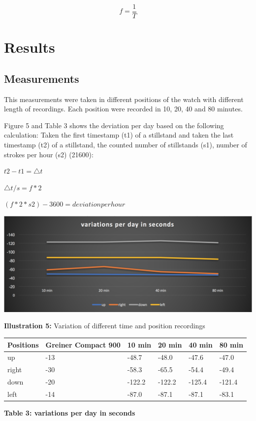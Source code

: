 \documentclass[12pt, a4paper]{report}
\begin{document}
 \begin{displaymath}
  f = \frac{1}{T}
 \end{displaymath}

\chapter{Results}

\section{Measurements}
This measurements were taken in different positions of the watch with different length
of recordings. Each position were recorded in 10, 20, 40 and 80 minutes.

Figure 5 and Table 3 shows the deviation per day based on the following calculation:
Taken the first timestamp (t1) of a stillstand and taken the last timestamp (t2) of a stillstand, the counted
number of stillstands (s1), number of strokes per hour (s2) (21600):
\bigskip

\(t2-t1 = \triangle t\)

\(\triangle t / s = f*2\)

\((f*2*s2)-3600=deviation per hour\)

\begin{center}
    \includegraphics[scale=0.3]{Images/variations_per_day.png}
    
    {\bf Illustration 5:} Variation of different time and position recordings
    \end{center}
\begin{table}[H]
    \begin{tabular}{|l|l|l|l|l|l|}
    \hline
    Positions & Greiner Compact 900 & 10 min & 20 min & 40 min & 80 min \\ \hline
    up        & -13                 & -48.7     & -48.0     & -47.6      & -47.0      \\ \hline
    right     & -30                 & -58.3      & -65.5    & -54.4      & -49.4      \\ \hline
    down      & -20                 & -122.2    & -122.2     & -125.4    & -121.4      \\ \hline
    left      & -14                 & -87.0	   & -87.1	  & -87.1	  & -83.1      \\ \hline
    \end{tabular}
\end{table}
\begin{center}    
{\bf Table 3: variations per day in seconds} 
\end{center}
\end{document}
